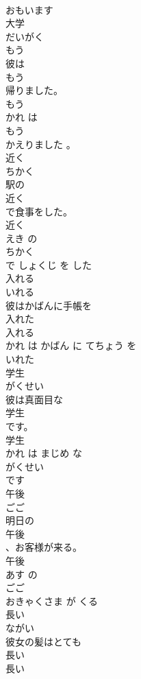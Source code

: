 \documentclass[8pt]{extreport}
\begin{document}
\begin{CJK}{UTF8}{min}
\\	おもいます	
\\	大学	
\\	だいがく	
\\	もう	
\\	彼は
\\	もう
\\	帰りました。	
\\	もう 
\\	かれ は 
\\	もう 
\\	かえりました 。	
\\	近く	
\\	ちかく	
\\	駅の
\\	近く
\\	で食事をした。	
\\	近く 
\\	えき の 
\\	ちかく
\\	で しょくじ を した	
\\	入れる	
\\	いれる	
\\	彼はかばんに手帳を
\\	入れた
\\	入れる 
\\	かれ は かばん に てちょう を 
\\	いれた
\\	学生	
\\	がくせい	
\\	彼は真面目な
\\	学生
\\	です。	
\\	学生 
\\	かれ は まじめ な 
\\	がくせい
\\	です	
\\	午後	
\\	ごご	
\\	明日の
\\	午後
\\	、お客様が来る。	
\\	午後 
\\	あす の 
\\	ごご
\\	おきゃくさま が くる	
\\	長い	
\\	ながい	
\\	彼女の髪はとても
\\	長い
\\	長い 

\end{CJK}
\end{document}
